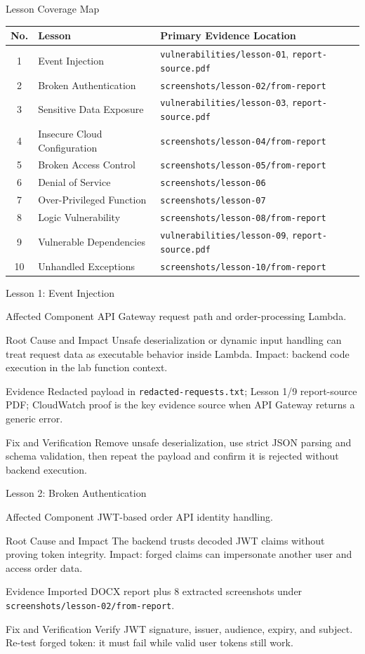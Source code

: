 \documentclass[aspectratio=169,11pt]{beamer}
\newcommand{\lessonframe}[5]{
\begin{frame}{#1}
  \small
  \begin{block}{Affected Component}
    #2
  \end{block}
  \begin{block}{Root Cause and Impact}
    #3
  \end{block}
  \begin{block}{Evidence}
    #4
  \end{block}
  \begin{block}{Fix and Verification}
    #5
  \end{block}
\end{frame}
}
\begin{document}
\begin{frame}{Lesson Coverage Map}
  \small
  \begin{tabular}{cll}
    \toprule
    No. & Lesson & Primary Evidence Location \\
    \midrule
    1 & Event Injection & \texttt{vulnerabilities/lesson-01}, \texttt{report-source.pdf} \\
    2 & Broken Authentication & \texttt{screenshots/lesson-02/from-report} \\
    3 & Sensitive Data Exposure & \texttt{vulnerabilities/lesson-03}, \texttt{report-source.pdf} \\
    4 & Insecure Cloud Configuration & \texttt{screenshots/lesson-04/from-report} \\
    5 & Broken Access Control & \texttt{screenshots/lesson-05/from-report} \\
    6 & Denial of Service & \texttt{screenshots/lesson-06} \\
    7 & Over-Privileged Function & \texttt{screenshots/lesson-07} \\
    8 & Logic Vulnerability & \texttt{screenshots/lesson-08/from-report} \\
    9 & Vulnerable Dependencies & \texttt{vulnerabilities/lesson-09}, \texttt{report-source.pdf} \\
    10 & Unhandled Exceptions & \texttt{screenshots/lesson-10/from-report} \\
    \bottomrule
  \end{tabular}
\end{frame}

\lessonframe
{Lesson 1: Event Injection}
{API Gateway request path and order-processing Lambda.}
{Unsafe deserialization or dynamic input handling can treat request data as executable behavior inside Lambda. Impact: backend code execution in the lab function context.}
{Redacted payload in \texttt{redacted-requests.txt}; Lesson 1/9 report-source PDF; CloudWatch proof is the key evidence source when API Gateway returns a generic error.}
{Remove unsafe deserialization, use strict JSON parsing and schema validation, then repeat the payload and confirm it is rejected without backend execution.}

\lessonframe
{Lesson 2: Broken Authentication}
{JWT-based order API identity handling.}
{The backend trusts decoded JWT claims without proving token integrity. Impact: forged claims can impersonate another user and access order data.}
{Imported DOCX report plus 8 extracted screenshots under \texttt{screenshots/lesson-02/from-report}.}
{Verify JWT signature, issuer, audience, expiry, and subject. Re-test forged token: it must fail while valid user tokens still work.}
\end{document}

